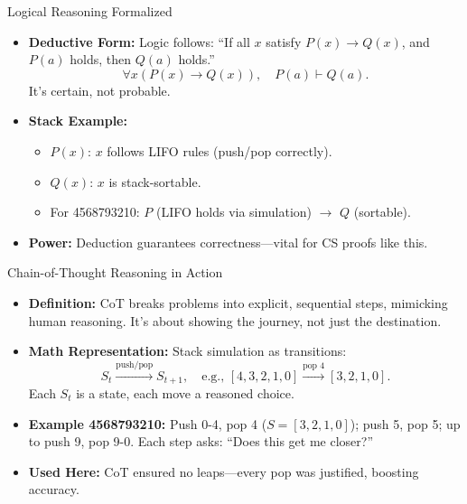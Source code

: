 \begin{frame}{Logical Reasoning Formalized}
    \begin{itemize}
        \item \textbf{Deductive Form:} Logic follows: “If all \( x \) satisfy \( P(x) \rightarrow Q(x) \), and \( P(a) \) holds, then \( Q(a) \) holds.”
        \[
        \forall x (P(x) \rightarrow Q(x)), \quad P(a) \vdash Q(a).
        \]
        It’s certain, not probable.
        \item \textbf{Stack Example:}
        \begin{itemize}
            \item \( P(x) \): \( x \) follows LIFO rules (push/pop correctly).
            \item \( Q(x) \): \( x \) is stack-sortable.
            \item For 4568793210: \( P \) (LIFO holds via simulation) \(\rightarrow\) \( Q \) (sortable).
        \end{itemize}
        \item \textbf{Power:} Deduction guarantees correctness—vital for CS proofs like this.
    \end{itemize}
\end{frame}

\begin{frame}{Chain-of-Thought Reasoning in Action}
    \begin{itemize}
        \item \textbf{Definition:} CoT breaks problems into explicit, sequential steps, mimicking human reasoning. It’s about showing the journey, not just the destination.
        \item \textbf{Math Representation:} Stack simulation as transitions:
        \[
        S_t \xrightarrow{\text{push/pop}} S_{t+1}, \quad \text{e.g., } [4, 3, 2, 1, 0] \xrightarrow{\text{pop 4}} [3, 2, 1, 0].
        \]
        Each \( S_t \) is a state, each move a reasoned choice.
        \item \textbf{Example 4568793210:} Push 0-4, pop 4 (\( S = [3, 2, 1, 0] \)); push 5, pop 5; up to push 9, pop 9-0. Each step asks: “Does this get me closer?”
        \item \textbf{Used Here:} CoT ensured no leaps—every pop was justified, boosting accuracy.
    \end{itemize}
\end{frame}

